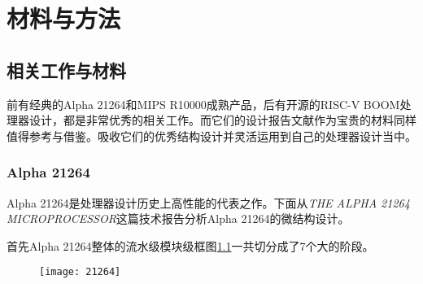 \chapter{材料与方法}\label{chap:Material_approach}
\section{相关工作与材料}\label{sec:meterial}
	前有经典的Alpha 21264和MIPS R10000成熟产品，后有开源的RISC-V BOOM处理器设计，都是非常优秀的相关工作。而它们的设计报告文献作为宝贵的材料同样值得参考与借鉴。吸收它们的优秀结构设计并灵活运用到自己的处理器设计当中。
	\subsection{Alpha 21264}\label{subsec:alpha}
	
	Alpha 21264是处理器设计历史上高性能的代表之作。下面从\textit{THE ALPHA 21264 MICROPROCESSOR}\citep{Alpha21264}这篇技术报告分析Alpha 21264的微结构设计。
	
	首先Alpha 21264整体的流水级模块级框图\ref{fig:alpha_stage}一共切分成了7个大的阶段。
	\begin{figure}[!htbp]
		\centering
		\texttt{[image: 21264]}
		\label{fig:alpha_stage}
	\end{figure}
	

